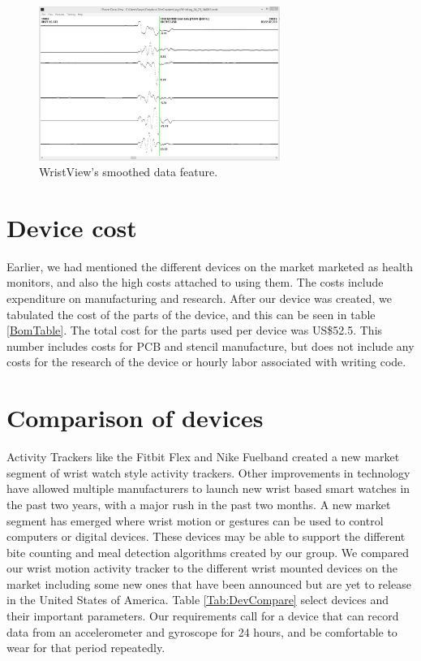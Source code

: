 \begin{figure}
\begin{center}
\includegraphics[width=0.7\textwidth]{images/WristSmooth.jpg}
\caption{WristView's smoothed data feature.}
\label{Fig:WristViewSoomth}
\end{center}
\end{figure}

\section{Device cost}
\label{Sec:DevCost}
Earlier, we had mentioned the different devices on the market marketed as health monitors,
and also the high costs attached to using them.
The costs include expenditure on manufacturing and research.
After our device was created, 
we tabulated the cost of the parts of the device, and this can be seen in table \ref{BomTable}.
The total cost for the parts used per device was US\$52.5.
This number includes costs for PCB and stencil manufacture, but does not include any costs for the research of the device or hourly labor associated with writing code.


\section{Comparison of devices}
\label{Sec:Comparison}
Activity Trackers like the Fitbit Flex and Nike Fuelband created a new market segment of
wrist watch style activity trackers.
Other improvements in technology have allowed multiple manufacturers to launch new
wrist based smart watches in the past two years,
with a major rush in the past two months.
A new market segment has emerged where
wrist motion or gestures can be used to control computers or digital devices.
These devices may be able to support the different bite counting and meal detection algorithms created by our group.
We compared our wrist motion activity tracker to the different wrist mounted devices on the market
including some new ones that have been announced but are yet to release in the United States of America.
Table \ref{Tab:DevCompare} select devices and their important parameters.
Our requirements call for a device that can record data from an accelerometer and gyroscope for 24 hours,
and be comfortable to wear for that period repeatedly.


